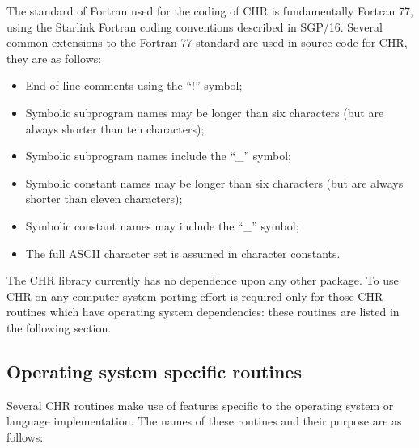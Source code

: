\documentclass[twoside,11pt,nolof]{starlink}
\begin{document}
The standard of Fortran used for the coding of CHR is fundamentally
Fortran 77, using the Starlink Fortran coding conventions described in SGP/16.
Several common extensions to the Fortran 77 standard are used in source
code for CHR, they are as follows:

\begin {itemize}
\item End-of-line comments using the ``!'' symbol;
\item Symbolic subprogram names may be longer than six characters (but are
always shorter than ten characters);
\item Symbolic subprogram names include the ``\_'' symbol;
\item Symbolic constant names may be longer than six characters (but are always
shorter than eleven characters);
\item Symbolic constant names may include the ``\_'' symbol;
\item The full ASCII character set is assumed in character constants.
\end {itemize}

The CHR library currently has no dependence upon any other package.
To use CHR on any computer system porting effort is required only for those
CHR routines which have operating system dependencies: these routines are
listed in the following section.


\subsection {Operating system specific routines}

Several CHR routines make use of features specific to the operating system or
language implementation.
The names of these routines and their purpose are as follows:
\end{document}
